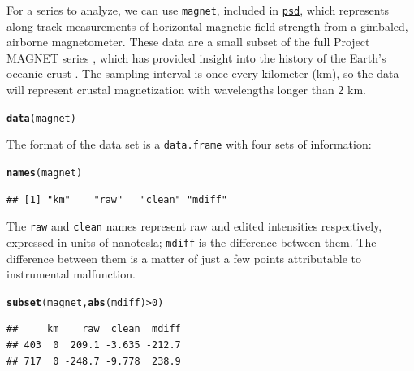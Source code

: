 \documentclass{article}\usepackage{graphicx, color}
\makeatletter
\newcommand{\hlfunctioncall}[1]{\textcolor[rgb]{0.501960784313725,0,0.329411764705882}{\textbf{#1}}}%
\newenvironment{kframe}{%
 \def\at@end@of@kframe{}%
 \ifinner\ifhmode%
  \def\at@end@of@kframe{\end{minipage}}%
  \begin{minipage}{\columnwidth}%
 \fi\fi%
 \def\FrameCommand##1{\hskip\@totalleftmargin \hskip-\fboxsep
 \colorbox{shadecolor}{##1}\hskip-\fboxsep
     \hskip-\linewidth \hskip-\@totalleftmargin \hskip\columnwidth}%
 \MakeFramed {\advance\hsize-\width
   \@totalleftmargin\z@ \linewidth\hsize
   \@setminipage}}%
 {\par\unskip\endMakeFramed%
 \at@end@of@kframe}
\newenvironment{knitrout}{}{} %
\newcommand{\Rcmd}[1]{\texttt{#1}}
\newcommand{\psd}[0]{\href{http://abarbour.github.com/psd/}{\color{blue}\Rcmd{psd}}}
\makeatother
\begin{document}
For a series to analyze, we can use \Rcmd{magnet}, included in \psd{},
which represents along-track measurements
of horizontal magnetic-field strength from a gimbaled, airborne magnetometer.
These data are a small subset of the full Project MAGNET series \citep{coleman1992},
which has provided insight into
the history of the Earth's oceanic crust 
\citep{parker1997, obrien1999, korte2002}.
The sampling interval is
once every kilometer (km), so the data will represent
crustal magnetization with wavelengths longer than 2 km.
\begin{knitrout}
\color{fgcolor}\begin{kframe}
\begin{alltt}
\hlfunctioncall{data}(magnet)
\end{alltt}
\end{kframe}
\end{knitrout}

The format of the data set is a \Rcmd{data.frame} with four
sets of information:
\begin{knitrout}
\color{fgcolor}\begin{kframe}
\begin{alltt}
\hlfunctioncall{names}(magnet)
\end{alltt}
\begin{verbatim}
## [1] "km"    "raw"   "clean" "mdiff"
\end{verbatim}
\end{kframe}
\end{knitrout}

The \Rcmd{raw} and \Rcmd{clean} names represent raw
and edited intensities respectively, expressed in units of nanotesla; 
\Rcmd{mdiff} is the difference between them.
The difference between them is a matter of just a few points
attributable to instrumental malfunction. 
\begin{knitrout}
\color{fgcolor}\begin{kframe}
\begin{alltt}
\hlfunctioncall{subset}(magnet, \hlfunctioncall{abs}(mdiff) > 0)
\end{alltt}
\begin{verbatim}
##     km    raw  clean  mdiff
## 403  0  209.1 -3.635 -212.7
## 717  0 -248.7 -9.778  238.9
\end{verbatim}
\end{kframe}
\end{knitrout}
\end{document}
